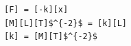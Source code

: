 \documentclass[border=10pt]{standalone}
\begin{document}
\begin{lstlisting}
[F] = [-k][x]
[M][L][T]$^{-2}$ = [k][L]
[k] = [M][T]$^{-2}$
\end{lstlisting}
\end{document}
